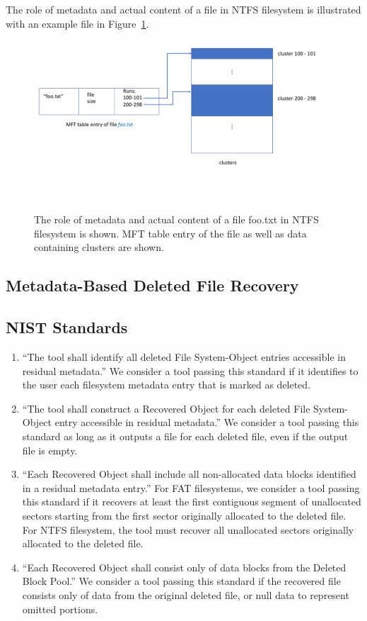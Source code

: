 The role of metadata and actual content of a file in NTFS filesystem is illustrated with an example file in Figure~\ref{fig:ntfs}.

\begin{figure}[h]
    \centering
    \includegraphics[width=\linewidth]{fig/ntfs.pdf}
    \caption{The role of metadata and actual content of a file foo.txt in NTFS filesystem is shown. MFT table entry of the file as well as data containing clusters are shown.}
    \label{fig:ntfs}
\end{figure}
\subsection{Metadata-Based Deleted File Recovery}

\subsection{NIST Standards}
\begin{enumerate}
 \item ``The tool shall identify all deleted File System-Object entries accessible in residual metadata.''\cite{meta:dfr:standards}
 We consider a tool passing this standard if it identifies to the user each filesystem metadata entry that is marked as deleted.
 \item ``The tool shall construct a Recovered Object for each deleted File System-Object entry accessible in residual metadata.''\cite{meta:dfr:standards}
 We consider a tool passing this standard as long as it outputs a file for each deleted file, even if the output file is empty.
 \item ``Each Recovered Object shall include all non-allocated data blocks identified in a residual metadata entry.''\cite{meta:dfr:standards}
 For FAT filesystems, we consider a tool passing this standard if it recovers at least the first contiguous segment of unallocated sectors starting from the first sector originally allocated to the deleted file. For NTFS filesystem, the tool must recover all unallocated sectors originally allocated to the deleted file.
 \item ``Each Recovered Object shall consist only of data blocks from the Deleted Block Pool.''\cite{meta:dfr:standards}
 We consider a tool passing this standard if the recovered file consists only of data from the original deleted file, or null data to represent omitted portions.
\end{enumerate}


